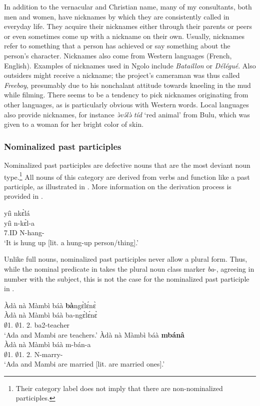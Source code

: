 In addition to the vernacular and Christian name, many of my consultants, both men and women, have nicknames by which they are consistently called in everyday life. They acquire their nicknames either through their parents or peers or even sometimes come up with a nickname on their own. Usually, nicknames refer to something that a person has achieved or say something about the person's character. Nicknames also come from Western languages (French, English). Examples of nicknames used in Ngolo include {\itshape Bataillon} or {\itshape Délégué}. Also outsiders might receive a nickname; the project's cameraman was thus called {\itshape Freeboy}, presumably due to his nonchalant attitude towards kneeling in the mud while filming. There seems to be a tendency to pick nicknames originating from other languages, as is particularly obvious with Western words. Local languages also provide nicknames, for instance {\itshape ə̀və́lə̀ tíd} `red animal' from Bulu, which was given to a woman for her bright color of skin.



\subsubsection{Nominalized past participles}
\label{sec:NounPart}

Nominalized past participles are defective nouns that are the most deviant noun type.\footnote{Their category label does not imply that there are non-nominalized participles.} All nouns of this category are derived from verbs and function like a past participle, as illustrated in . More information on the derivation process is provided in .

\ea \label{NounPart1}
\glll yíì nkɛ̀lá\\
yíì n-kɛ̀l-a \\
7.ID N-hang-{\NOM} \\
\trans `It is hung up [lit. a hung-up person/thing].'
\z

Unlike full nouns, nominalized past participles never allow a plural form. Thus, while the nominal predicate in  takes the plural noun class marker {\itshape ba}-, agreeing in number with the subject, this is not the case for the nominalized past participle in .

\ea \label{NounPart2}
  \ea \label{NounPart2a}
\glll Àdà nà Màmbì báà {\bfseries bà}ngɛ̀lɛ́nɛ̀ \\
 Àdà nà Màmbì báà ba-ngɛ̀lɛ́nɛ̀ \\
$\emptyset$1.{\PN} {\COM} $\emptyset$1.{\PN} 2.{\COP} ba2-teacher \\
\trans `Ada and Mambi are teachers.'
\ex\label{NounPart2b} 
\glll Àdà nà Màmbì báà {\bfseries mbánâ} \\
 Àdà nà Màmbì báà m-bán-a \\
$\emptyset$1.{\PN} {\COM} $\emptyset$1.{\PN} 2.{\COP} N-marry-{\NOM} \\
\trans `Ada and Mambi are married [lit. are married ones].'
\z
\z


